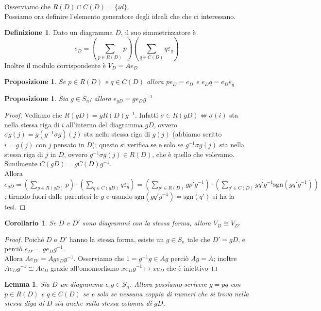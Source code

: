 \documentclass[11pt]{article}
\theoremstyle{plain}
\newtheorem{lemma}[thm]{Lemma}
\newtheorem{prop}[thm]{Proposizione}
\newtheorem*{cor}{Corollario}
\theoremstyle{definition}
\newtheorem{defn}{Definizione}[section]
\theoremstyle{remark}
\begin{document}
Osserviamo che $R(D)\cap C(D)=\{id\}$.\\
Possiamo ora definire l'elemento generatore degli ideali che che ci interessano.
\begin{defn}
	Dato un diagramma $D$, il suo simmetrizzatore è $$e_D=\left(\sum_{p\in R(D)}p \right)\left(\sum_{q\in C(D)}q\varepsilon_q\right)$$
	Inoltre il modulo corrispondente è $V_D=Ae_D$
\end{defn}
\begin{prop}\label{prop:assorbimento eD}
	Se $p\in R(D)$ e $q\in C(D)$ allora $pe_D=e_D$ e $e_Dq=e_D\varepsilon_q$
\end{prop}
\begin{prop}
	Sia $g\in S_n$; allora $e_{gD}=ge_Dg^{-1}$
\end{prop}
\begin{proof}
	Vediamo che $R(gD)=gR(D)g^{-1}$. Infatti $\sigma\in R(gD)\iff\sigma(i)$ sta nella stessa riga di $i$ all'interno del diagramma $gD$, ovvero $\sigma g (j)=g(g^{-1}\sigma g)(j)$ sta nella stessa riga di $g(j)$ (abbiamo scritto $i=g(j)$ con $j$ pensato in $D$); questo si verifica se e solo se $g^{-1}\sigma g(j)$ sta nella stessa riga di $j$ in $D$, ovvero $g^{-1}\sigma g(j)\in R(D)$, che è quello che volevamo.\\
	Similmente $C(gD)=gC(D)g^{-1}$.\\
	Allora $\displaystyle e_{gD}=\left(\sum_{p\in R(gD)}p \right)\cdot\left(\sum_{q\in C(gD)}q\varepsilon_q\right)=\left(\sum_{p'\in R(D)}gp'g^{-1} \right)\cdot\left(\sum_{q'\in C(D)}gq'g^{-1}\text{sgn}(gq'g^{-1})\right)$; tirando fuori dalle parentesi le $g$ e usando $\text{sgn}(gq'g^{-1})=\text{sgn}(q')$ si ha la tesi.
\end{proof}
\begin{cor}
	Se $D$ e $D'$ sono diagrammi con la stessa forma, allora $V_D\cong V_{D'}$
\end{cor}
\begin{proof}
	Poiché $D$ e $D'$ hanno la stessa forma, esiste un $g\in S_n$ tale che $D'=gD$, e perciò $e_{D'}=ge_Dg^{-1}$.\\
	Allora $Ae_{D'}=Age_Dg^{-1}$. Osserviamo che $1=g^{-1}g\in Ag$ perciò $Ag=A$; inoltre $Ae_Dg^{-1}\cong Ae_D$ grazie all'omomorfismo $xe_Dg^{-1}\mapsto xe_D$ che è iniettivo
\end{proof}
\begin{lemma}\label{Sn:g=pq}
	Sia $D$ un diagramma e $g\in S_n$. Allora possiamo scrivere $g=pq$ con $p\in R(D)$ e $q\in C(D)$ se e solo se nessuna coppia di numeri che si trova nella stessa diga di $D$ sta anche sulla stessa colonna di $gD$.
\end{lemma}
\end{document}
